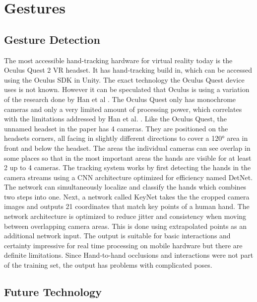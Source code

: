 \section{Gestures}\label{gestures}

\subsection{Gesture Detection}\label{gesture-detection}

The most accessible hand-tracking hardware for virtual reality today is
the Oculus Quest 2 VR headset. It has hand-tracking build in, which can
be accessed using the Oculus SDK in Unity. The exact technology the
Oculus Quest device uses is not known. However it can be speculated that
Oculus is using a variation of the research done by Han et al \cite{Han}. The
Oculus Quest only has monochrome cameras and only a very limited amount
of processing power, which correlates with the limitations addressed by
Han et al. \cite{Han}. Like the Oculus Quest, the
unnamed headset in the paper has 4 cameras. They are positioned on the
headsets corners, all facing in slightly different directions to cover a
120° area in front and below the headset. The areas the individual
cameras can see overlap in some places so that in the most important
areas the hands are visible for at least 2 up to 4 cameras. The
tracking system works by first detecting the hands in the camera streams
using a CNN architecture optimized for efficiency named DetNet. The
network can simultaneously localize and classify the hands which
combines two steps into one. Next, a network called KeyNet takes the the
cropped camera images and outputs 21 coordinates that match key points
of a human hand. The network architecture is optimized to reduce jitter
and consistency when moving between overlapping camera areas. This is
done using extrapolated points as an additional network input. The
output is suitable for basic interactions and certainty impressive for
real time processing on mobile hardware but there are definite
limitations. Since Hand-to-hand occlusions and interactions were not
part of the training set, the output has problems with complicated
poses.

\subsection{Future Technology}\label{future-technology}

